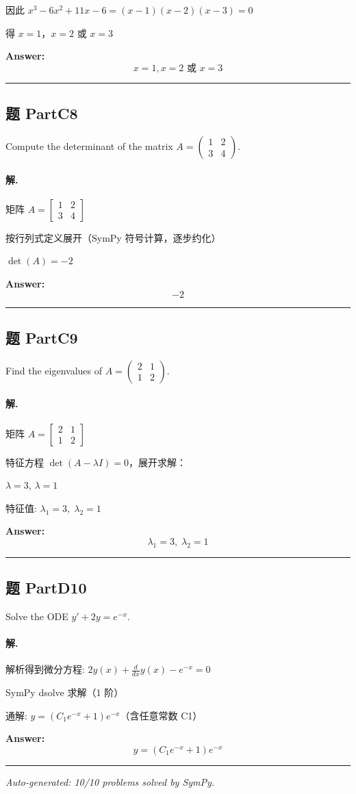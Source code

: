 \documentclass[12pt, a4paper]{article}
\newcommand{\problem}[1]{\subsection*{题 #1}}
\newcommand{\solution}{\paragraph{解.}}
\begin{document}
因此 $x^3 - 6x^2 + 11x - 6 = (x-1)(x-2)(x-3) = 0$

得 $x = 1$，$x = 2$ 或 $x = 3$

\textbf{Answer:}
\[\boxed{x = 1, x = 2 \text{ 或 } x = 3}\]

\vspace{1em}
\hrule
\vspace{1em}

\problem{PartC8}

Compute the determinant of the matrix $A = \begin{pmatrix} 1 & 2 \\ 3 & 4 \end{pmatrix}$.

\solution

矩阵 $A = \left[\begin{matrix}1 & 2\\3 & 4\end{matrix}\right]$

按行列式定义展开（SymPy 符号计算，逐步约化）

$\det(A) = -2$

\textbf{Answer:}
\[\boxed{-2}\]

\vspace{1em}
\hrule
\vspace{1em}

\problem{PartC9}

Find the eigenvalues of $A = \begin{pmatrix} 2 & 1 \\ 1 & 2 \end{pmatrix}$.

\solution

矩阵 $A = \left[\begin{matrix}2 & 1\\1 & 2\end{matrix}\right]$

特征方程 $\det(A - \lambda I) = 0$，展开求解：

$\lambda = 3$, $\lambda = 1$

特征值: $\lambda_{1} = 3, \; \lambda_{2} = 1$

\textbf{Answer:}
\[\boxed{\lambda_{1} = 3, \; \lambda_{2} = 1}\]

\vspace{1em}
\hrule
\vspace{1em}

\problem{PartD10}

Solve the ODE $y' + 2y = e^{-x}$.

\solution

解析得到微分方程: $2 y{\left(x \right)} + \frac{d}{d x} y{\left(x \right)} - e^{- x} = 0$

SymPy dsolve 求解（1 阶）

通解: $y = \left(C_{1} e^{- x} + 1\right) e^{- x}$（含任意常数 C1）

\textbf{Answer:}
\[\boxed{y = \left(C_{1} e^{- x} + 1\right) e^{- x}}\]

\vspace{1em}
\hrule
\vspace{1em}


\vspace{2em}
\noindent\textit{Auto-generated: 10/10 problems solved by SymPy.}
\end{document}
